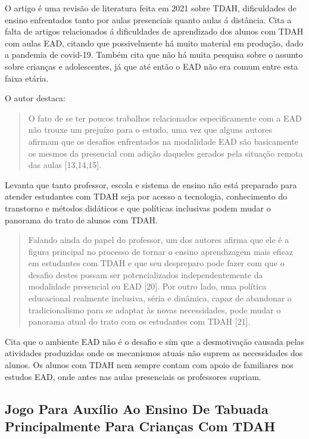 O artigo\cite{okuyama} é uma revisão de literatura feita em 2021 sobre TDAH, dificuldades de ensino enfrentados tanto por aulas presenciais quanto aulas á distância. Cita a falta de artigos relacionados á dificuldades de aprendizado dos alunos com TDAH com aulas EAD, citando que possivelmente há muito material em produção, dado a pandemia de covid-19. Também cita que não há muita pesquisa sobre o assunto sobre crianças e adolescentes, já que até então o EAD não era comum entre esta faixa etária. 

O autor destaca:

\begin{quote}
O fato de se ter poucos trabalhos relacionados especificamente com a EAD não trouxe um prejuízo para o estudo, uma vez que alguns autores afirmam que os desafios enfrentados na modalidade EAD são basicamente os mesmos da presencial com adição daqueles gerados pela situação remota das aulas [13,14,15].
\end{quote}

Levanta que tanto professor, escola e sistema de ensino não está preparado para atender estudantes com TDAH seja por acesso a tecnologia, conhecimento do transtorno e métodos didáticos e que políticas inclusivas podem mudar o panorama do trato de alunos com TDAH. 

\begin{quote}
Falando ainda do papel do professor, um dos autores afirma que ele é a figura principal no processo de tornar o ensino aprendizagem mais eficaz em estudantes com TDAH e que seu despreparo pode fazer com que o desafio destes possam ser potencializados independentemente da modalidade presencial ou EAD [20]. Por outro lado, uma política educacional realmente inclusiva, séria e dinâmica, capaz de abandonar o tradicionalismo para se adaptar às novas necessidades, pode mudar o panorama atual do trato com os estudantes com TDAH [21].
\end{quote}

Cita que o ambiente EAD não é o desafio e sim que a desmotivação causada pelas atividades produzidas onde os mecanismos atuais não suprem as necessidades dos alunos. Os alunos com TDAH nem sempre contam com apoio de familiares nos estudos EAD, onde antes nas aulas presenciais os professores supriam. 


\subsection{Jogo Para Auxílio Ao Ensino De Tabuada Principalmente Para Crianças Com TDAH}

